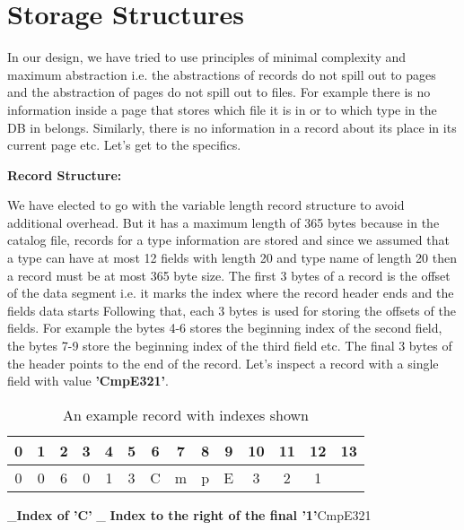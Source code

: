 \documentclass{article}
\begin{document}
\section{Storage Structures}
\label{sec:structures}
In our design, we have tried to use principles of minimal complexity and maximum abstraction i.e. the abstractions of records do not spill out to pages and the abstraction of pages do not spill out to files. For example there is no information inside a page that stores which file it is in or to which type in the DB in belongs. Similarly, there is no information in a record about its place in its current page etc. Let's get to the specifics. \newline

\textbf{Record Structure:}

We have elected to go with the variable length record structure to avoid additional overhead. But it has a maximum length of 365 bytes because in the catalog file, records for a type information are stored and since we assumed that a type can have at most 12 fields with length 20 and type name of length 20 then a record must be at most 365 byte size. The first 3 bytes of a record is the offset of the data segment i.e. it marks the index where the record header ends and the fields data starts Following that, each 3 bytes is used for storing the offsets of the fields. For example the bytes 4-6 stores the beginning index of the second field, the bytes 7-9 store the beginning index of the third field etc. The final 3 bytes of the header points to the end of the record. Let's inspect a record with a single field with value \textbf{'CmpE321'}. \newline



\begin{table}[H]
\centering
\begin{tabular}{| c| c | c | c |c|c|c|c|c|c|c|c|c|c |}
\hline
\textbf{0} & \textbf{1} & \textbf{2} & \textbf{3} & \textbf{4} & \textbf{5} & \textbf{6} & \textbf{7} & \textbf{8} & \textbf{9} & \textbf{10} & \textbf{11} & \textbf{12} & \textbf{13}  \\
\hline
0 & 0 & 6 & 0 & 1 & 3 & C & m & p & E & 3 & 2 & 1 & \\ \hline
\end{tabular}
\label{tab:ex}
\caption{An example record with indexes shown}
\end{table}

\begin{center}
_\textbf{Index of 'C'      }_\textbf{  Index to the right of the final '1'}CmpE321

\end{center}
\end{document}
